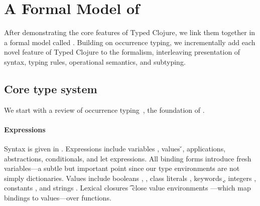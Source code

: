 \section{A Formal Model of \lambdatc{}}

\label{sec:formal}

After demonstrating the core features of Typed Clojure, 
we link them together in a formal model called
\lambdatc{}.
%
Building on occurrence typing,
we incrementally add each
novel feature of Typed Clojure to the formalism,
interleaving presentation of syntax, typing rules, operational semantics,
and subtyping.

\subsection{Core type system}
\label{sec:coretypesystem}

We start with a review of
occurrence typing~\cite{TF10}, the foundation of \lambdatc{}.

\paragraph{Expressions} Syntax is given in . Expressions \e{} 
include variables \x{}, values \v{},
applications, abstractions, conditionals, and let expressions.
All binding forms introduce fresh variables---a subtle but important point since our type environments
are not simply dictionaries.
Values include booleans \bool{}, \nil{}, class literals {\class{}}, keywords \k{},
integers {\nat{}},
constants {\const{}}, and strings \str{}. Lexical closures {\closure {\openv{}} {\abs {\x{}} {\t{}} {\e{}}}}
close value environments \openv{}---which map bindings to values---over functions.

